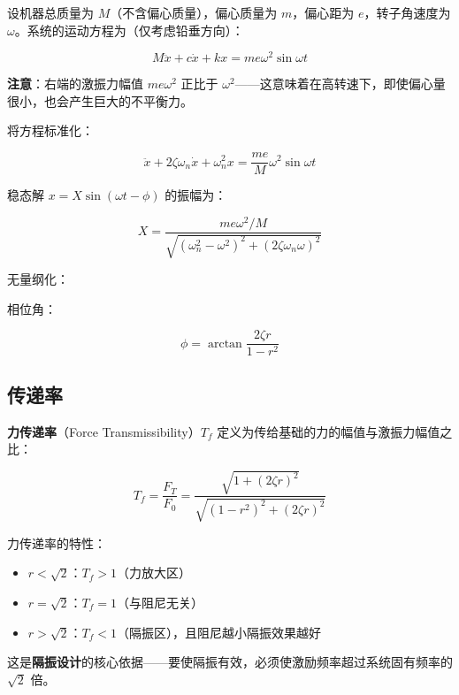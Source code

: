 设机器总质量为 $M$（不含偏心质量），偏心质量为 $m$，偏心距为 $e$，转子角速度为 $\omega$。系统的运动方程为（仅考虑铅垂方向）：
\begin{myformula}
    \[
    M\ddot{x} + c\dot{x} + kx = me\omega^2\sin\omega t
    \]
\end{myformula}

\textbf{注意}：右端的激振力幅值 $me\omega^2$ 正比于 $\omega^2$——这意味着在高转速下，即使偏心量很小，也会产生巨大的不平衡力。

将方程标准化：
\begin{myformula}
    \[
    \ddot{x} + 2\zeta\omega_n\dot{x} + \omega_n^2 x = \frac{me}{M}\omega^2\sin\omega t
    \]
\end{myformula}

稳态解 $x = X\sin(\omega t - \phi)$ 的振幅为：
\begin{myformula}
    \[
    X = \frac{me\omega^2/M}{\sqrt{(\omega_n^2 - \omega^2)^2 + (2\zeta\omega_n\omega)^2}}
    \]
\end{myformula}

无量纲化：
\begin{myformula}
    \end{myformula}

相位角：
\begin{myformula}
    \[
    \phi = \arctan\frac{2\zeta r}{1-r^2}
    \]
\end{myformula}

\subsection{传递率}

\textbf{力传递率}（Force Transmissibility）$T_f$ 定义为传给基础的力的幅值与激振力幅值之比：
\begin{myformula}
    \[
    T_f = \frac{F_T}{F_0} = \frac{\sqrt{1 + (2\zeta r)^2}}{\sqrt{(1-r^2)^2 + (2\zeta r)^2}}
    \]
\end{myformula}

力传递率的特性：
\begin{itemize}
    \item $r < \sqrt{2}$：$T_f > 1$（力放大区）
    \item $r = \sqrt{2}$：$T_f = 1$（与阻尼无关）
    \item $r > \sqrt{2}$：$T_f < 1$（隔振区），且阻尼越小隔振效果越好
\end{itemize}

这是\textbf{隔振设计}的核心依据——要使隔振有效，必须使激励频率超过系统固有频率的 $\sqrt{2}$ 倍。

